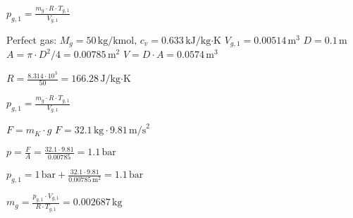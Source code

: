 \( p_{g,1} = \frac{m_g \cdot R \cdot T_{g,1}}{V_{g,1}} \)  

Perfect gas: \( M_g = 50 \, \text{kg/kmol}, \, c_v = 0.633 \, \text{kJ/kg·K} \)  
\( V_{g,1} = 0.00514 \, \text{m}^3 \)  
\( D = 0.1 \, \text{m} \)  
\( A = \pi \cdot D^2 / 4 = 0.00785 \, \text{m}^2 \)  
\( V = D \cdot A = 0.0574 \, \text{m}^3 \)  

\( R = \frac{8.314 \cdot 10^3}{50} = 166.28 \, \text{J/kg·K} \)  

\( p_{g,1} = \frac{m_g \cdot R \cdot T_{g,1}}{V_{g,1}} \)  

\( F = m_K \cdot g \)  
\( F = 32.1 \, \text{kg} \cdot 9.81 \, \text{m/s}^2 \)  

\( p = \frac{F}{A} = \frac{32.1 \cdot 9.81}{0.00785} = 1.1 \, \text{bar} \)  

\( p_{g,1} = 1 \, \text{bar} + \frac{32.1 \cdot 9.81}{0.00785 \, \text{m}^2} = 1.1 \, \text{bar} \)  

\( m_g = \frac{p_{g,1} \cdot V_{g,1}}{R \cdot T_{g,1}} = 0.002687 \, \text{kg} \)